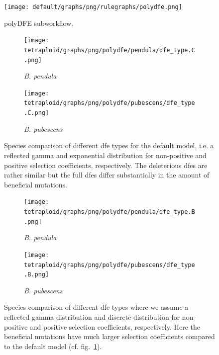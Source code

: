 \documentclass[hidelinks,11pt]{article}
\newcommand{\pendula}{\textit{B. pendula}}
\newcommand{\pubescens}{\textit{B. pubescens}}
\begin{document}
    \begin{figure}[H]
        \centering
        \texttt{[image: default/graphs/png/rulegraphs/polydfe.png]}
        \caption{polyDFE subworkflow.}
    \end{figure}

    \begin{figure}[H]
        \centering
        \begin{subfigure}[b]{0.49\textwidth}
            \centering
            \texttt{[image: tetraploid/graphs/png/polydfe/pendula/dfe\_type.C.png]}
            \caption{\pendula{}}
        \end{subfigure}
        \hfill
        \begin{subfigure}[b]{0.49\textwidth}
            \centering
            \texttt{[image: tetraploid/graphs/png/polydfe/pubescens/dfe\_type.C.png]}
            \caption{\pubescens{}}
        \end{subfigure}
        \caption{Species comparison of different \acrshort{dfe} types for the default model, i.e. a reflected gamma and exponential distribution for non-positive and positive selection coefficients, respectively. The deleterious \acrshort{dfe}s are rather similar but the full \acrshort{dfe}s differ substantially in the amount of beneficial mutations.}
        \label{fig:dfe_type_C}
    \end{figure}

    \begin{figure}[H]
        \centering
        \begin{subfigure}[b]{0.49\textwidth}
            \centering
            \texttt{[image: tetraploid/graphs/png/polydfe/pendula/dfe\_type.B.png]}
            \caption{\pendula{}}
        \end{subfigure}
        \hfill
        \begin{subfigure}[b]{0.49\textwidth}
            \centering
            \texttt{[image: tetraploid/graphs/png/polydfe/pubescens/dfe\_type.B.png]}
            \caption{\pubescens{}}
        \end{subfigure}
        \caption{Species comparison of different \acrshort{dfe} types where we assume a reflected gamma distribution and discrete distribution for non-positive and positive selection coefficients, respectively. Here the beneficial mutations have much larger selection coefficients compared to the default model (cf. fig.~\ref{fig:dfe_type_C}).}
        \label{fig:dfe_type_B}
    \end{figure}
\end{document}
